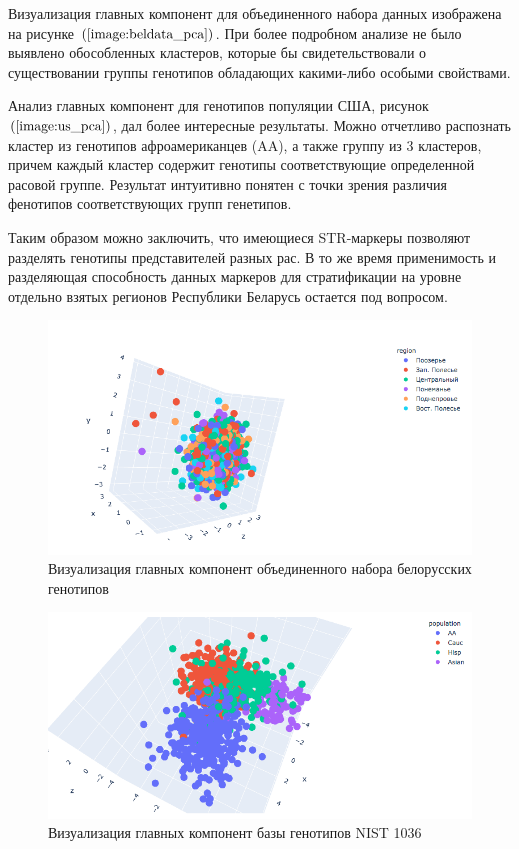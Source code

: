 Визуализация главных компонент для объединенного набора данных изображена на рисунке $\left(\ref{image:beldata_pca}\right)$.
При более подробном анализе не было выявлено обособленных кластеров, которые бы свидетельствовали
о существовании группы генотипов обладающих какими-либо особыми свойствами.

Анализ главных компонент для генотипов популяции США, рисунок $\left(\ref{image:us_pca}\right)$,
дал более интересные результаты. Можно отчетливо распознать кластер из генотипов афроамериканцев (AA),
а также группу из 3 кластеров, причем каждый кластер содержит генотипы соответствующие определенной
расовой группе. Результат интуитивно понятен с точки зрения различия фенотипов соответствующих
групп генетипов.

Таким образом можно заключить, что имеющиеся STR-маркеры позволяют разделять
генотипы представителей разных рас. В то же время применимость и разделяющая способность данных маркеров
для стратификации на уровне отдельно взятых регионов Республики Беларусь остается под вопросом.

\begin{figure}[h]
\begin{center}
\includegraphics[width=14cm]{images/beldata_pca.png}
\end{center}
  \caption{Визуализация главных компонент объединенного набора белорусских генотипов}
  \label{image:beldata_pca}
\end{figure}

\begin{figure}[h]
\begin{center}
\includegraphics[width=14cm]{images/us_pca.png}
\end{center}
  \caption{Визуализация главных компонент базы генотипов NIST 1036}
  \label{image:us_pca}
\end{figure}

